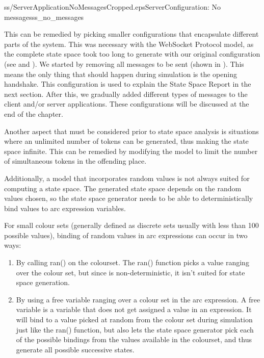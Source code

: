 		{ss/ServerApplicationNoMessagesCropped.eps}{Server}{Configuration:
		No messages}{ss_no_messages}
	
		This can be remedied by picking smaller configurations that encapsulate
		different parts of the system. This was necessary with the WebSocket Protocol
		model, as the complete state space took too long to generate with our
		original configuration (see  and ).
		We started by removing all messages to be sent (shown in
		).
		This means the only thing that should happen during simulation is the opening
		handshake. This configuration is used to explain the State Space Report in
		the next section.
		After this, we gradually added different types of messages to the client
		and/or server applications. These configurations will be discussed at the end
		of the chapter.
		
		Another aspect that must be considered prior to state space analysis is
		situations where an unlimited number of tokens can be generated, thus making
		the state space infinite. This can be remedied by modifying the model to
		limit the number of simultaneous tokens in the offending place.
		
		Additionally, a model that incorporates random values is not always suited
		for computing a state space. The generated state space depends on the random
		values chosen, so the state space generator needs to be able to
		deterministically bind values to arc expression variables.
				
		For small colour sets (generally defined as discrete sets usually with less
		than 100 possible values), binding of random values in arc expressions can
		occur in two ways: 
		\begin{enumerate}
		\item By calling ran() on the colourset. The ran() function picks a value
		ranging over the colour set, but since is non-deterministic, it isn't
		suited for state space generation.
		\item By using a free variable ranging over a colour set in the arc expression.
		A free variable is a variable that does not get assigned a value in an expression. It will 
		bind to a value picked at random from the colour set during simulation just
		like the ran() function, but also lets the state space generator pick each of 
		the possible bindings from the values available in the colourset, and thus
		generate all possible successive states. 
		\end{enumerate}
		

